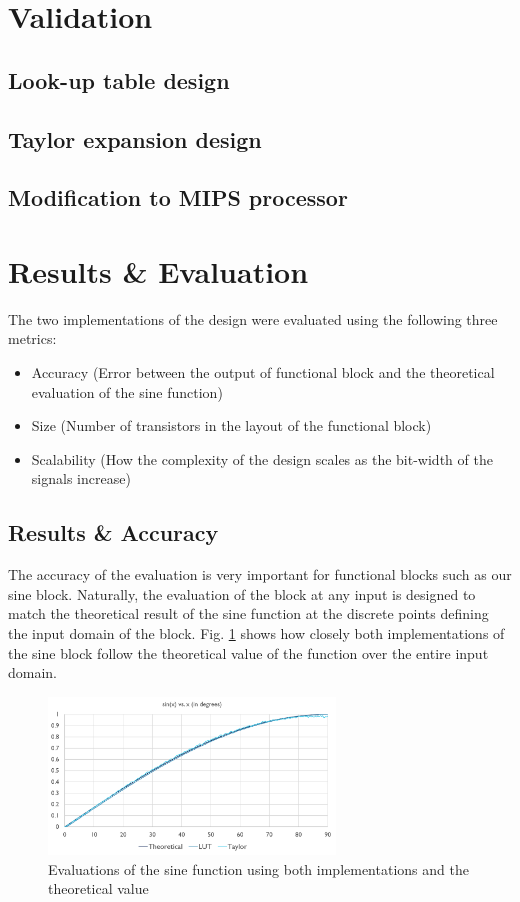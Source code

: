 \documentclass[10pt,journal]{IEEEtran}
\begin{document}
\section{Validation}
	
	\subsection{Look-up table design}
	\subsection{Taylor expansion design}
	\subsection{Modification to MIPS processor}

\section{Results \& Evaluation}
The two implementations of the design were evaluated using the following three metrics:
\begin{itemize}
\item Accuracy (Error between the output of functional block and the theoretical evaluation of the sine function)
\item Size (Number of transistors in the layout of the functional block)
\item Scalability (How the complexity of the design scales as the bit-width of the signals increase)
\end{itemize}

\subsection{Results \& Accuracy}
The accuracy of the evaluation is very important for functional blocks such as our sine block. Naturally, the evaluation of the block at any input is designed to match the theoretical result of the sine function at the discrete points defining the input domain of the block. Fig. \ref{results} shows how closely both implementations of the sine block follow the theoretical value of the function over the entire input domain.
\begin{figure}[h]
\centering
\includegraphics[width=3in]{results.png}
\caption{Evaluations of the sine function using both implementations and the theoretical value}
\label{results}
\end{figure}
\end{document}
